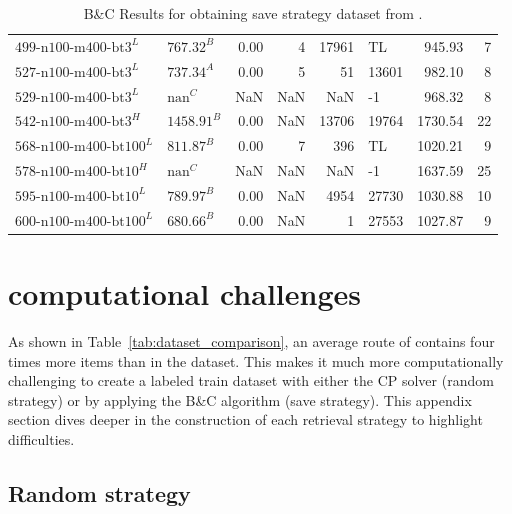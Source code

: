 \begin{table}[ht]
\begin{tabular}{llrrrlrr}
		$\text{499-n100-m400-bt3}^L$   & $\text{767.32}^B$  & 0.00 & 4     & 17961  & TL    & 945.93  & 7     \\
		$\text{527-n100-m400-bt3}^L$   & $\text{737.34}^A$  & 0.00 & 5     & 51     & 13601 & 982.10  & 8     \\
		$\text{529-n100-m400-bt3}^L$   & $\text{nan}^C$     & NaN  & NaN   & NaN    & -1    & 968.32  & 8     \\
		$\text{542-n100-m400-bt3}^H$   & $\text{1458.91}^B$ & 0.00 & NaN   & 13706  & 19764 & 1730.54 & 22    \\
		$\text{568-n100-m400-bt100}^L$ & $\text{811.87}^B$  & 0.00 & 7     & 396    & TL    & 1020.21 & 9     \\
		$\text{578-n100-m400-bt10}^H$  & $\text{nan}^C$     & NaN  & NaN   & NaN    & -1    & 1637.59 & 25    \\
		$\text{595-n100-m400-bt10}^L$  & $\text{789.97}^B$  & 0.00 & NaN   & 4954   & 27730 & 1030.88 & 10    \\
		$\text{600-n100-m400-bt100}^L$ & $\text{680.66}^B$  & 0.00 & NaN   & 1      & 27553 & 1027.87 & 9     \\
		\bottomrule
	\end{tabular}
	\caption{B\&C Results for obtaining save strategy dataset from \krebsADataSet.}
	\label{tab:bc_results_krebs}
\end{table}

\clearpage

\section{\krebsADataSetText computational challenges}
\label{app:sec:krebs_computationally_challenges}

As shown in Table~\ref{tab:dataset_comparison}, an average route of \krebsADataSetText contains four times more items than
in the \gendreauDataSetText dataset. This makes it much more computationally challenging to create a labeled train dataset with either
the \gls{CP} solver (random strategy) or by applying the B\&C algorithm (save strategy). This appendix section dives deeper in
the construction of each retrieval strategy to highlight difficulties.

\subsection{Random strategy}
\label{subsec:challenges_krebs_random}

